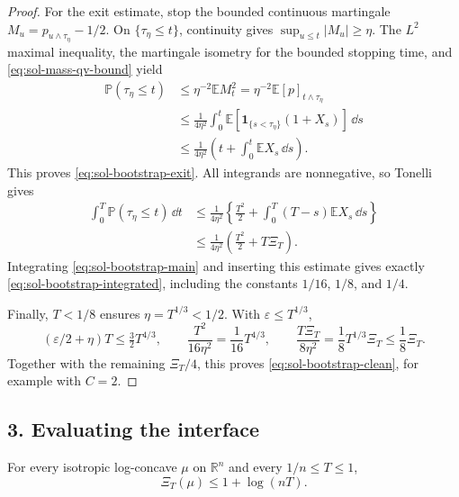 \documentclass[../main.tex]{subfiles}
\begin{document}
\begin{proof}
For the exit estimate, stop the bounded continuous martingale
$M_u=p_{u\wedge\tau_\eta}-1/2$.  On $\{\tau_\eta\leq t\}$, continuity gives
$\sup_{u\leq t}|M_u|\geq\eta$.  The $L^2$ maximal inequality, the martingale isometry for the
bounded stopping time, and \eqref{eq:sol-mass-qv-bound} yield
\[
\begin{split}
  \mathbb P(\tau_\eta\leq t)
  &\leq\eta^{-2}\mathbb E M_t^2
   =\eta^{-2}\mathbb E[p]_{t\wedge\tau_\eta}\\
  &\leq\frac1{4\eta^2}\int_0^t
       \mathbb E[\mathbf 1_{\{s<\tau_\eta\}}(1+X_s)]\,\dd s\\
  &\leq\frac1{4\eta^2}\left(t+\int_0^t\mathbb E X_s\,\dd s\right).
\end{split}
\]
This proves \eqref{eq:sol-bootstrap-exit}.  All integrands are nonnegative, so Tonelli gives
\[
\begin{split}
  \int_0^T\mathbb P(\tau_\eta\leq t)\,\dd t
  &\leq\frac1{4\eta^2}\left\{
      \frac{T^2}{2}+\int_0^T(T-s)\mathbb E X_s\,\dd s\right\}\\
  &\leq\frac1{4\eta^2}\left(\frac{T^2}{2}+T\Xi_T\right).
\end{split}
\]
Integrating \eqref{eq:sol-bootstrap-main} and inserting this estimate gives exactly
\eqref{eq:sol-bootstrap-integrated}, including the constants $1/16$, $1/8$, and $1/4$.

Finally, $T<1/8$ ensures $\eta=T^{1/3}<1/2$.  With
$\varepsilon\leq T^{1/3}$,
\[
  (\varepsilon/2+\eta)T\leq\tfrac32T^{4/3},\qquad
  \frac{T^2}{16\eta^2}=\frac1{16}T^{4/3},\qquad
  \frac{T\Xi_T}{8\eta^2}=\frac18T^{1/3}\Xi_T\leq\frac18\Xi_T.
\]
Together with the remaining $\Xi_T/4$, this proves
\eqref{eq:sol-bootstrap-clean}, for example with $C=2$.
\end{proof}

\subsection*{3. Evaluating the interface}

\begin{lemma}
\label{lem:sol-crude}
For every isotropic log-concave $\mu$ on $\mathbb R^n$ and every $1/n\leq T\leq1$,
\[
  \Xi_T(\mu)\leq1+\log(nT).
\]
\end{lemma}
\end{document}
